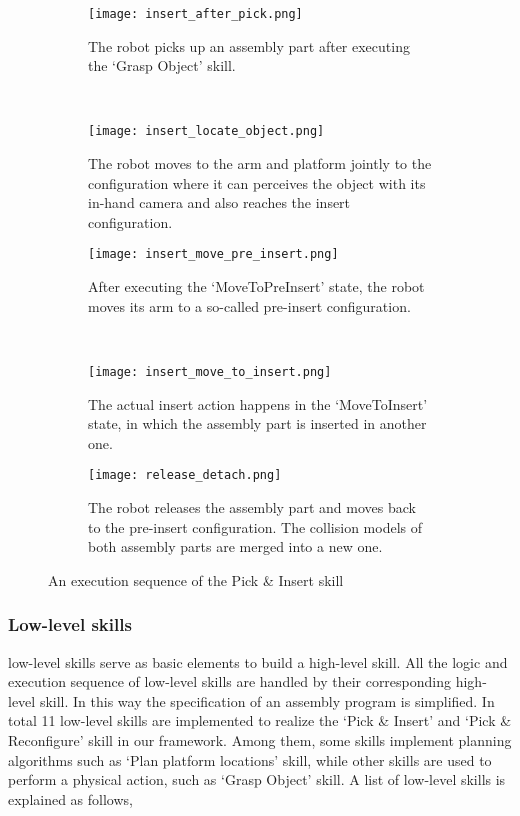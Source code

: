 \begin{figure}[!htbp]
\captionsetup[subfigure]{position=b}
    \centering
    \begin{subfigure}[t]{0.45\textwidth}
        \texttt{[image: insert\_after\_pick.png]}
        \caption{The robot picks up an assembly part after executing the `Grasp Object' skill.}
        \label{fig:insert_after_pick}
    \end{subfigure}
    ~
    \begin{subfigure}[t]{0.45\textwidth}
        \texttt{[image: insert\_locate\_object.png]}
        \caption{The robot moves to the arm and platform jointly to the configuration where it can perceives the object with its in-hand camera and also reaches the insert configuration.}
        \label{fig:insert_locate_object}
    \end{subfigure}
    
    \begin{subfigure}[t]{0.45\textwidth}
        \texttt{[image: insert\_move\_pre\_insert.png]}
        \caption{After executing the `MoveToPreInsert' state, the robot moves its arm to a so-called pre-insert configuration.}
        \label{fig:insert_move_pre_insert}
    \end{subfigure}
    ~
    \begin{subfigure}[t]{0.45\textwidth}
        \texttt{[image: insert\_move\_to\_insert.png]}
        \caption{The actual insert action happens in the `MoveToInsert' state, in which the assembly part is inserted in another one.}
        \label{fig:insert_move_to_insert}
    \end{subfigure}
      
    \begin{subfigure}[t]{0.45\textwidth}
        \texttt{[image: release\_detach.png]}
        \caption{The robot releases the assembly part and moves back to the pre-insert configuration. The collision models of both assembly parts are merged into a new one.}
        \label{fig:release_detach}
    \end{subfigure}
    \caption{An execution sequence of the Pick \& Insert skill}\label{fig:example_pick_and_insert}
\end{figure} 

\subsubsection{Low-level skills}
low-level skills serve as basic elements to build a high-level skill. All the logic and execution sequence of low-level skills are handled by their corresponding high-level skill. In this way the specification of an assembly program is simplified. In total 11 low-level skills are implemented to realize the `Pick \& Insert' and `Pick \& Reconfigure' skill in our framework. Among them, some skills implement planning algorithms such as `Plan platform locations' skill, while other skills are used to  perform a physical action, such as `Grasp Object' skill. A list of low-level skills is explained as follows,

